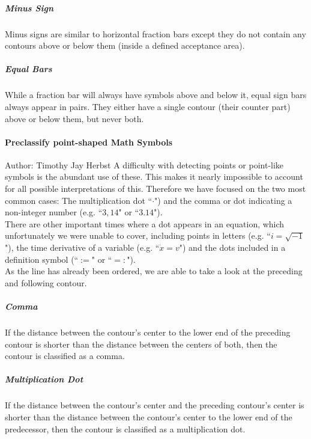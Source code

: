 \documentclass[11pt]{article}
\begin{document}
	\subparagraph{Minus Sign}
	Minus signs are similar to horizontal fraction bars except they do not contain any contours above or below them (inside a defined acceptance area).

	\subparagraph{Equal Bars}\label{equalbars}
	While a fraction bar will always have symbols above and below it, equal sign bars always appear in pairs. They either have a single contour (their counter part) above or below them, but never both.
	
	\paragraph{Preclassify point-shaped Math Symbols}
	\newline
	\small{Author: Timothy Jay Herbst} \newline \newline
	A difficulty with detecting points or point-like symbols is the abundant use of these.
	This makes it nearly impossible to account for all possible interpretations of this.
	Therefore we have focused on the two most common cases:
	The multiplication dot ``$\cdot$") and the comma or dot indicating a non-integer number (e.g. ``$3,14$" or ``$3.14$").\\
	There are other important times where a dot appears in an equation, which unfortunately we were unable to cover, including points in letters (e.g. ``$i=\sqrt{-1}$"), the time derivative of a variable (e.g. ``$\dot{x}=v$") and the dots included in a definition symbol (``$:=$" or ``$=:$").\\  %
	As the line has already been ordered, we are able to take a look at the preceding and following contour.
	
	\subparagraph{Comma}
	If the distance between the contour's center to the lower end of the preceding contour is shorter than the distance between the centers of both, then the contour is classified as a comma.\\
	
	\subparagraph{Multiplication Dot}
	If the distance between the contour's center and the preceding contour's center is shorter than the distance between the contour's center to the lower end of the predecessor, then the contour is classified as a multiplication dot.\\
\end{document}
